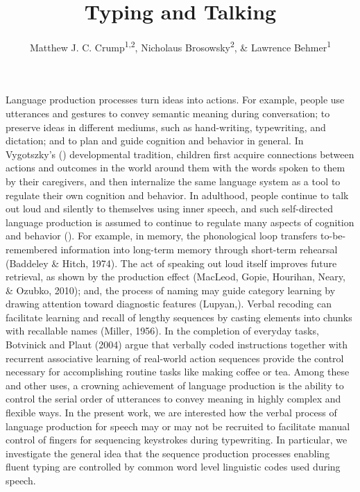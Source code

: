\documentclass[,man,floatsintext]{apa6}
\title{Typing and Talking}
\author{Matthew J. C. Crump\textsuperscript{1,2}, Nicholaus Brosowsky\textsuperscript{2}, \& Lawrence Behmer\textsuperscript{1}}
\date{}
\affiliation{
\vspace{0.5cm}
\textsuperscript{1} Brooklyn College of the City University of New York\\\textsuperscript{2} Graduate Center of the City University of New York}
\begin{document}
\maketitle

Language production processes turn ideas into actions. For example, people use utterances and gestures to convey semantic meaning during conversation; to preserve ideas in different mediums, such as hand-writing, typewriting, and dictation; and to plan and guide cognition and behavior in general. In Vygotszky's () developmental tradition, children first acquire connections between actions and outcomes in the world around them with the words spoken to them by their caregivers, and then internalize the same language system as a tool to regulate their own cognition and behavior. In adulthood, people continue to talk out loud and silently to themselves using inner speech, and such self-directed language production is assumed to continue to regulate many aspects of cognition and behavior (). For example, in memory, the phonological loop transfers to-be-remembered information into long-term memory through short-term rehearsal (Baddeley \& Hitch, 1974). The act of speaking out loud itself improves future retrieval, as shown by the production effect (MacLeod, Gopie, Hourihan, Neary, \& Ozubko, 2010); and, the process of naming may guide category learning by drawing attention toward diagnostic features (Lupyan,). Verbal recoding can facilitate learning and recall of lengthy sequences by casting elements into chunks with recallable names (Miller, 1956). In the completion of everyday tasks, Botvinick and Plaut (2004) argue that verbally coded instructions together with recurrent associative learning of real-world action sequences provide the control necessary for accomplishing routine tasks like making coffee or tea. Among these and other uses, a crowning achievement of language production is the ability to control the serial order of utterances to convey meaning in highly complex and flexible ways. In the present work, we are interested how the verbal process of language production for speech may or may not be recruited to facilitate manual control of fingers for sequencing keystrokes during typewriting. In particular, we investigate the general idea that the sequence production processes enabling fluent typing are controlled by common word level linguistic codes used during speech.
\end{document}
